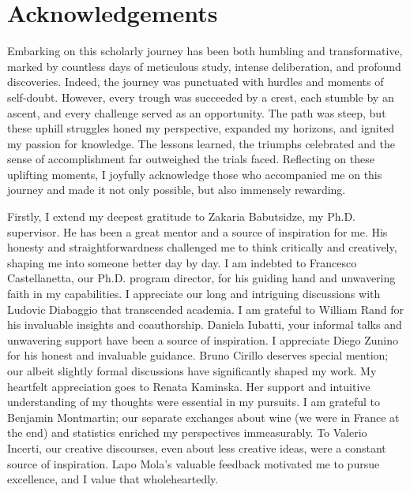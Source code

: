 \documentclass[a4paper,12pt]{article}
\begin{document}
\section*{Acknowledgements}

Embarking on this scholarly journey has been both humbling and transformative, marked by countless days of meticulous study, intense deliberation, and profound discoveries. Indeed, the journey was punctuated with hurdles and moments of self-doubt. However, every trough was succeeded by a crest, each stumble by an ascent, and every challenge served as an opportunity. The path was steep, but these uphill struggles honed my perspective, expanded my horizons, and ignited my passion for knowledge. The lessons learned, the triumphs celebrated and the sense of accomplishment far outweighed the trials faced. Reflecting on these uplifting moments, I joyfully acknowledge those who accompanied me on this journey and made it not only possible, but also immensely rewarding.

Firstly, I extend my deepest gratitude to Zakaria Babutsidze, my Ph.D. supervisor. He has been a great mentor and a source of inspiration for me. His honesty and straightforwardness challenged me to think critically and creatively, shaping me into someone better day by day. I am indebted to Francesco Castellanetta, our Ph.D. program director, for his guiding hand and unwavering faith in my capabilities. I appreciate our long and intriguing discussions with Ludovic Diabaggio that transcended academia. I am grateful to William Rand for his invaluable insights and coauthorship. Daniela Iubatti, your informal talks and unwavering support have been a source of inspiration. I appreciate Diego Zunino for his honest and invaluable guidance. Bruno Cirillo deserves special mention; our albeit slightly formal discussions have significantly shaped my work. My heartfelt appreciation goes to Renata Kaminska. Her support and intuitive understanding of my thoughts were essential in my pursuits. I am grateful to Benjamin Montmartin; our separate exchanges about wine (we were in France at the end) and statistics enriched my perspectives immeasurably. To Valerio Incerti, our creative discourses, even about less creative ideas, were a constant source of inspiration. Lapo Mola's valuable feedback motivated me to pursue excellence, and I value that wholeheartedly.
\end{document}
